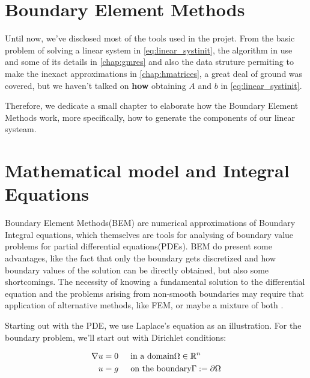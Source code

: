 \section{Boundary Element Methods}

Until now, we've disclosed most of the tools used in the projet. From the basic problem of solving a linear system in \ref{eq:linear_systinit}, the algorithm in use and some of its details in \autoref{chap:gmres} and also the data struture permiting to make the inexact approximations in \autoref{chap:hmatrices}, a great deal of ground was covered, but we haven't talked on \textbf{how} obtaining $A$ and $b$ in \ref{eq:linear_systinit}.

Therefore, we dedicate a small chapter to elaborate how the Boundary Element Methods work, more specifically, how to generate the components of our linear systeam.

\section{Mathematical model and Integral Equations}

Boundary Element Methods(BEM) are numerical approximations of Boundary Integral equations, which themselves are tools for analysing of boundary value problems for partial differential equations(PDEs). BEM do present some advantages, like the fact that only the boundary gets discretized and how boundary values of the solution can be directly obtained, but also some shortcomings. The necessity of knowing a fundamental solution to the differential equation and the problems arising from non-smooth boundaries may require that application of alternative methods, like FEM, or maybe a mixture of both \cite{costabel1987principles}.

Starting out with the PDE, we use Laplace's equation as an illustration. For the boundary problem, we'll start out with Dirichlet conditions:


\begin{align}\label{eq:pde_model}
    \begin{split}
        \nabla u &= 0 \hspace{0.2in} \text{in a domain} \Omega \in \mathbb{R}^{n}\\
        u &= g \hspace{0.2in} \text{on the boundary} \Gamma := \partial \Omega
    \end{split}
\end{align}

